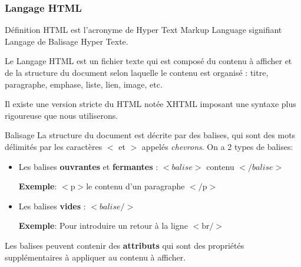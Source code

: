 \documentclass[8pt]{beamer}
\begin{document}
\begin{frame}
\frametitle{Langage HTML}

\begin{block}{Définition}
HTML est l'acronyme de Hyper Text Markup Language signifiant Langage de Balisage Hyper Texte.

Le Langage HTML est un fichier texte qui est composé du contenu à afficher et de la structure du document selon laquelle le contenu est organisé : titre, paragraphe, emphase, liste, lien, image, etc.

Il existe une version stricte du HTML notée XHTML imposant une syntaxe plus rigoureuse que nous utiliserons.
\end{block}

\begin{block}{Balisage}
La structure du document est décrite par des balises, qui sont des mots délimités par les caractères $<$ et $>$ appelés \textit{chevrons}. On a 2 types de balises:

\begin{itemize}
\item Les balises \textbf{ouvrantes} et \textbf{fermantes }: $<balise>$ contenu $</balise>$

\textbf{Exemple}: $<\text{p}>$le contenu d'un paragraphe $</ \text{p}>$

\item Les balises \textbf{vides} : $<balise />$

\textbf{Exemple}: Pour introduire un retour à la ligne $<\text{br} />$
\end{itemize}

Les balises peuvent contenir des \textbf{attributs} qui sont des propriétés supplémentaires à appliquer au contenu à afficher.
\end{block}


\end{frame}
\end{document}
